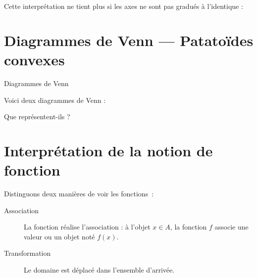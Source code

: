 \begin{frame}
  \begin{remark*}
 Cette interprétation ne tient plus si les axes ne sont
pas gradués à l'identique :
\end{remark*}
\begin{center}
    \def\xmax{4}%
    \def\ymax{3}%
\end{center}
\end{frame}

\section{Diagrammes de Venn — Patatoïdes convexes}
\begin{frame}{Diagrammes de Venn}%
\begin{exercise}
  Voici deux diagrammes de Venn :
  \begin{center}
    \raisebox{-.5\height}{\begin{venndiagram2sets}[shade=red]
      \fillACapB
    \end{venndiagram2sets}}
    \raisebox{-.5\height}{\begin{venndiagram3sets}[shade=green]
      \fillOnlyA
    \end{venndiagram3sets}}
  \end{center}
  Que représentent-ils ?
\end{exercise}
\end{frame}

\section{Interprétation de la notion de fonction}
\begin{frame}
  Distinguons deux manières de \og voir\fg{} les fonctions~:
  \begin{description}
  \item[Association] La fonction réalise l'association : à l'objet $x \in A$, la fonction $f$ associe une valeur ou un objet noté $f(x)$.\pause
  \item[Transformation] Le domaine est \og déplacé\fg{} dans l'ensemble d'arrivée.
  \end{description}
\end{frame}

